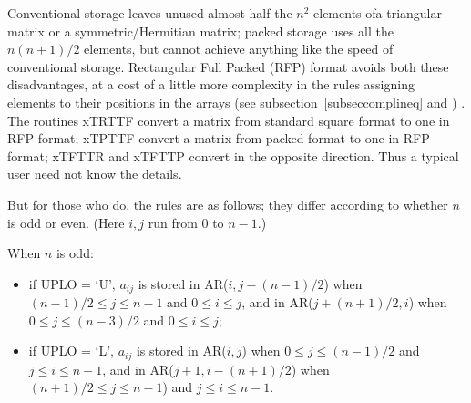 Conventional storage leaves unused almost half the $n^2$ elements ofa triangular matrix or a
symmetric/Hermitian matrix; packed storage uses all the $n(n+1)/2$ elements, but cannot achieve
anything like the speed of conventional storage. 
Rectangular Full Packed (RFP) format avoids both these
disadvantages, at a cost of a little more complexity in the rules assigning elements to their positions
in the arrays (see subsection~\ref{subseccomplineq} and \cite{gustavsonetal08})
.
The routines xTRTTF convert a matrix from standard square format to one in RFP format;
xTPTTF 
convert a matrix from packed format to one in RFP format;
xTFTTR and xTFTTP convert in the opposite direction. 
Thus a typical user need not know the details.

But for those who do, the rules are as follows; they differ according to whether $n$ is odd or even.
(Here $i, j$ run from $0$ to $n-1$.) 

When $n$ is odd:
\begin {itemize}
\item if UPLO = `U', 
$a_{ij}$ is stored in AR($i,j-(n-1)/2$) when $(n-1)/2 \leq j \leq n-1$ and $0 \leq i \leq j$,
and in AR($j+(n+1)/2,i$) when $0 \leq j \leq (n-3)/2$ and $0 \leq i \leq j$;
\item if UPLO = `L',
$a_{ij}$ is stored in AR($i,j$) when $0 \leq j \leq (n-1)/2$ and $j \leq i \leq n-1$,
and in AR($j+1,i-(n+1)/2$) when $(n+1)/2 \leq j \leq n-1$) and $j \leq i \leq n-1$.
\end{itemize}

